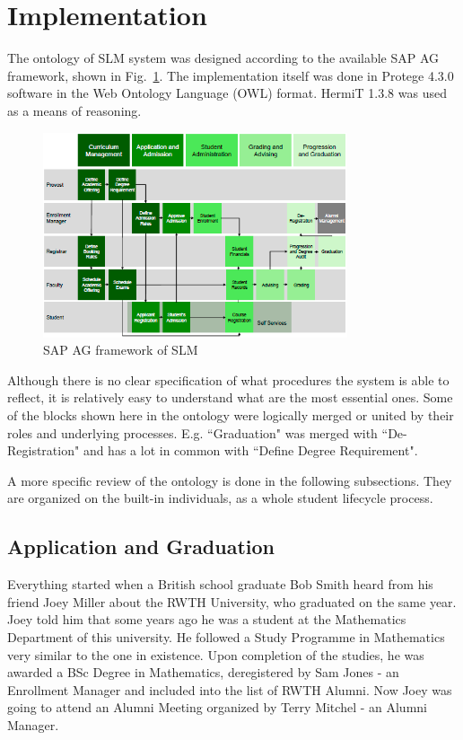 \documentclass{article}    %
\begin{document}
\section{Implementation}
%
The ontology of SLM system was designed according to the available SAP AG framework, shown in Fig.~\ref{SAP}. The implementation itself was done in Protege 4.3.0 software in the Web Ontology Language (OWL) format. HermiT 1.3.8 was used as a means of reasoning. 
\begin{figure}[htbp]
  \centering
    \includegraphics[width=0.8\textwidth]{Materials/Figures/1.png}
    \caption{SAP AG framework of SLM~\cite{sap}}
  \label{SAP}
\end{figure}

Although there is no clear specification of what procedures the system is able to reflect, it is relatively easy to understand what are the most essential ones. Some of the blocks shown here in the ontology were logically merged or united by their roles and underlying processes. E.g. ``Graduation" was merged with ``De-Registration" and has a lot in common with ``Define Degree Requirement". 

A more specific review of the ontology is done in the following subsections. They are organized on the built-in individuals, as a whole student lifecycle process.
%
\subsection{Application and Graduation}
%
Everything started when a British school graduate Bob Smith heard from his friend Joey Miller about the RWTH University, who graduated on the same year. Joey told him that some years ago he was a student at the Mathematics Department of this university. He followed a Study Programme in Mathematics very similar to the one in existence. Upon completion of the studies, he was awarded a BSc Degree in Mathematics, deregistered by Sam Jones - an Enrollment Manager and included into the list of RWTH Alumni. Now Joey was going to attend an Alumni Meeting organized by Terry Mitchel - an Alumni Manager.
\end{document}
